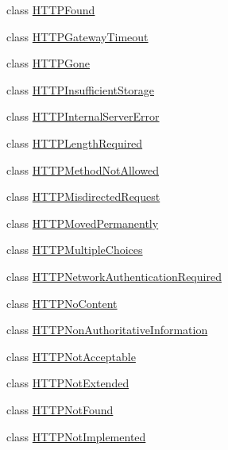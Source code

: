 \begin{DoxyCompactItemize}
class \hyperlink{classaiohttp_1_1web__exceptions_1_1_h_t_t_p_found}{H\+T\+T\+P\+Found}
\item 
class \hyperlink{classaiohttp_1_1web__exceptions_1_1_h_t_t_p_gateway_timeout}{H\+T\+T\+P\+Gateway\+Timeout}
\item 
class \hyperlink{classaiohttp_1_1web__exceptions_1_1_h_t_t_p_gone}{H\+T\+T\+P\+Gone}
\item 
class \hyperlink{classaiohttp_1_1web__exceptions_1_1_h_t_t_p_insufficient_storage}{H\+T\+T\+P\+Insufficient\+Storage}
\item 
class \hyperlink{classaiohttp_1_1web__exceptions_1_1_h_t_t_p_internal_server_error}{H\+T\+T\+P\+Internal\+Server\+Error}
\item 
class \hyperlink{classaiohttp_1_1web__exceptions_1_1_h_t_t_p_length_required}{H\+T\+T\+P\+Length\+Required}
\item 
class \hyperlink{classaiohttp_1_1web__exceptions_1_1_h_t_t_p_method_not_allowed}{H\+T\+T\+P\+Method\+Not\+Allowed}
\item 
class \hyperlink{classaiohttp_1_1web__exceptions_1_1_h_t_t_p_misdirected_request}{H\+T\+T\+P\+Misdirected\+Request}
\item 
class \hyperlink{classaiohttp_1_1web__exceptions_1_1_h_t_t_p_moved_permanently}{H\+T\+T\+P\+Moved\+Permanently}
\item 
class \hyperlink{classaiohttp_1_1web__exceptions_1_1_h_t_t_p_multiple_choices}{H\+T\+T\+P\+Multiple\+Choices}
\item 
class \hyperlink{classaiohttp_1_1web__exceptions_1_1_h_t_t_p_network_authentication_required}{H\+T\+T\+P\+Network\+Authentication\+Required}
\item 
class \hyperlink{classaiohttp_1_1web__exceptions_1_1_h_t_t_p_no_content}{H\+T\+T\+P\+No\+Content}
\item 
class \hyperlink{classaiohttp_1_1web__exceptions_1_1_h_t_t_p_non_authoritative_information}{H\+T\+T\+P\+Non\+Authoritative\+Information}
\item 
class \hyperlink{classaiohttp_1_1web__exceptions_1_1_h_t_t_p_not_acceptable}{H\+T\+T\+P\+Not\+Acceptable}
\item 
class \hyperlink{classaiohttp_1_1web__exceptions_1_1_h_t_t_p_not_extended}{H\+T\+T\+P\+Not\+Extended}
\item 
class \hyperlink{classaiohttp_1_1web__exceptions_1_1_h_t_t_p_not_found}{H\+T\+T\+P\+Not\+Found}
\item 
class \hyperlink{classaiohttp_1_1web__exceptions_1_1_h_t_t_p_not_implemented}{H\+T\+T\+P\+Not\+Implemented}

\end{DoxyCompactItemize}
